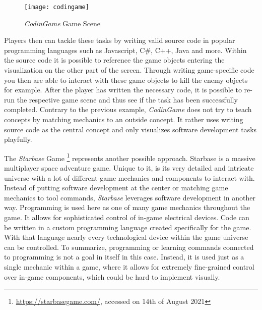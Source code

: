 \begin{figure}[h]
  \centering
  \texttt{[image: codingame]}
  \caption{\textit{CodinGame} Game Scene}
  \label{fig:codingame}
\end{figure}

Players then can tackle these tasks by writing valid source code in popular programming languages such as Javascript, C\#, C++, Java and more. Within the source code it is possible to reference the game objects entering the visualization on the other part of the screen. Through writing game-specific code you then are able to interact with these game objects to kill the enemy objects for example. After the player has written the necessary code, it is possible to re-run the respective game scene and thus see if the task has been successfully completed. Contrary to the previous example, \textit{CodinGame} does not try to teach concepts by matching mechanics to an outside concept. It rather uses writing source code as the central concept and only visualizes software development tasks playfully.

The \textit{Starbase} Game \footnote{\url{https://starbasegame.com/}, accessed on 14th of August 2021} represents another possible approach. Starbase is a massive multiplayer space adventure game. Unique to it, is its very detailed and intricate universe with a lot of different game mechanics and components to interact with. Instead of putting software development at the center or matching game mechanics to tool commands, \textit{Starbase} leverages software development in another way. Programming is used here as one of many game mechanics throughout the game. It allows for sophisticated control of in-game electrical devices. Code can be written in a custom programming language created specifically for the game. With that language nearly every technological device within the game universe can be controlled. To summarize, programming or learning commands connected to programming is not a goal in itself in this case. Instead, it is used just as a single mechanic within a game, where it allows for extremely fine-grained control over in-game components, which could be hard to implement visually.

